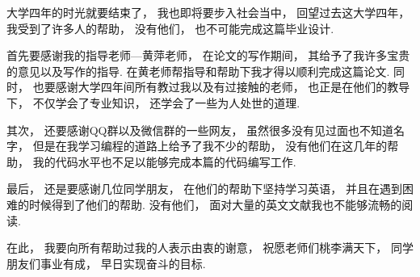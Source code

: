 \documentclass{hainanuthesis}
\begin{document}
\newpage
\tableofcontents
\newpage



















\begin{acknowledge}
    大学四年的时光就要结束了，
    我也即将要步入社会当中，
    回望过去这大学四年，
    我受到了许多人的帮助，
    没有他们，
    也不可能完成这篇毕业设计.

    首先要感谢我的指导老师---黄萍老师，
    在论文的写作期间，
    其给予了我许多宝贵的意见以及写作的指导.
    在黄老师帮指导和帮助下我才得以顺利完成这篇论文.
    同时，
    也要感谢大学四年间所有教过我以及有过接触的老师，
    也正是在他们的教导下，
    不仅学会了专业知识，
    还学会了一些为人处世的道理.

    其次，
    还要感谢QQ群以及微信群的一些网友，
    虽然很多没有见过面也不知道名字，
    但是在我学习编程的道路上给予了我不少的帮助，
    没有他们在这几年的帮助，
    我的代码水平也不足以能够完成本篇的代码编写工作.

    最后，
    还是要感谢几位同学朋友，
    在他们的帮助下坚持学习英语，
    并且在遇到困难的时候得到了他们的帮助.
    没有他们，
    面对大量的英文文献我也不能够流畅的阅读.

    在此，
    我要向所有帮助过我的人表示由衷的谢意，
    祝愿老师们桃李满天下，
    同学朋友们事业有成，
    早日实现奋斗的目标.
\end{acknowledge}

\printbib{}
\end{document}
